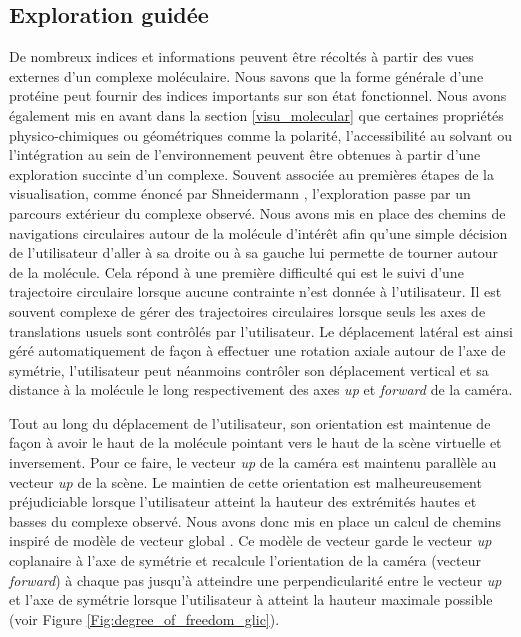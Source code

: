 
\subsection{Exploration guidée}

De nombreux indices et informations peuvent être récoltés à partir des vues externes d'un complexe moléculaire. Nous savons que la forme générale d'une protéine peut fournir des indices importants sur son état fonctionnel. Nous avons également mis en avant dans la section \ref{visu_molecular} que certaines propriétés physico-chimiques ou géométriques comme la polarité, l'accessibilité au solvant ou l'intégration au sein de l'environnement peuvent être obtenues à partir d'une exploration succinte d'un complexe. Souvent associée au premières étapes de la visualisation, comme énoncé par Shneidermann \cite{shneiderman_eyes_1996}, l'exploration passe par un parcours extérieur du complexe observé. Nous avons mis en place des chemins de navigations circulaires autour de la molécule d'intérêt afin qu'une simple décision de l'utilisateur d'aller à sa droite ou à sa gauche lui permette de tourner autour de la molécule. Cela répond à une première difficulté qui est le suivi d'une trajectoire circulaire lorsque aucune contrainte n'est donnée à l'utilisateur. Il est souvent complexe de gérer des trajectoires circulaires lorsque seuls les axes de translations usuels sont contrôlés par l'utilisateur. Le déplacement latéral est ainsi géré automatiquement de façon à effectuer une rotation axiale autour de l'axe de symétrie, l'utilisateur peut néanmoins contrôler son déplacement vertical et sa distance à la molécule le long respectivement des axes \textit{up} et \textit{forward} de la caméra.

Tout au long du déplacement de l'utilisateur, son orientation est maintenue de façon à avoir le haut de la molécule pointant vers le haut de la scène virtuelle et inversement. Pour ce faire, le vecteur \textit{up} de la caméra est maintenu parallèle au vecteur \textit{up} de la scène. Le maintien de cette orientation est malheureusement préjudiciable lorsque l'utilisateur atteint la hauteur des extrémités hautes et basses du complexe observé. Nous avons donc mis en place un calcul de chemins inspiré de modèle de vecteur global \cite{khan_hovercam:_2005}. Ce modèle de vecteur garde le vecteur \textit{up} coplanaire à l'axe de symétrie et recalcule l'orientation de la caméra (vecteur \textit{forward}) à chaque pas jusqu'à atteindre une perpendicularité entre le vecteur \textit{up} et l'axe de symétrie lorsque l'utilisateur à atteint la hauteur maximale possible (voir Figure \ref{Fig:degree_of_freedom_glic}).

